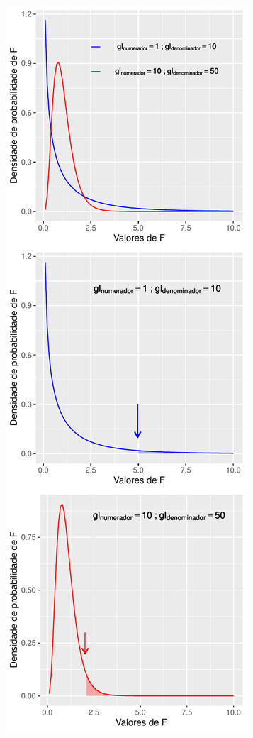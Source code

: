 \documentclass[
]{book}
\begin{document}
\begin{center}\includegraphics{probest-cambientais_files/figure-latex/unnamed-chunk-151-1} \end{center}
\end{document}
